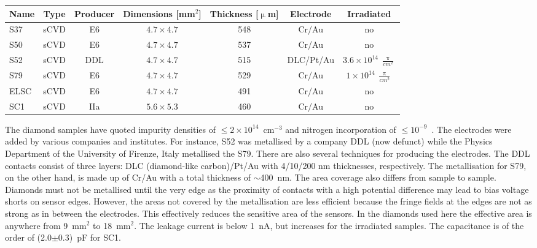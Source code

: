 \begin{footnotesize}
\begin{center}
\begin{tabular}{   l  c  c  c  c c c }
\hline
Name & Type &Producer & Dimensions [mm$^2$] & Thickness [$\upmu$m] & Electrode & Irradiated \\
\hline
S37 & sCVD & E6 & $4.7\times4.7$ & 548 & Cr/Au & no \\
S50 & sCVD & E6 & $4.7\times4.7$ & 537 & Cr/Au & no \\
S52 & sCVD & DDL & $4.7\times4.7$ & 515 & DLC/Pt/Au & $3.6\times10^{14}~\frac{\uppi}{cm^{2}}$ \\
S79 & sCVD & E6 & $4.7\times4.7$ & 529 & Cr/Au & $1\times10^{14}~\frac{\uppi}{cm^{2}}$ \\
ELSC & sCVD & E6 & $4.7\times4.7$ & 491 & Cr/Au & no \\
SC1 & sCVD & IIa & $5.6\times5.3$ & 460 & Cr/Au & no \\
\hline
\end{tabular}
\label{tab:diamsamp}
\end{center}
\end{footnotesize}

The diamond samples have quoted impurity densities of $\leq2\times10^{14}$~cm$^{-3}$ and nitrogen incorporation of $\leq10^{-9}$~\cite{Jansen:1956431}. The electrodes were added by various companies and institutes. For instance, S52 was metallised by a company DDL (now defunct) while the Physics Department of the University of Firenze, Italy metallised the S79. There are also several techniques for producing the electrodes. The DDL contacts consist of three layers: DLC (diamond-like carbon)/Pt/Au with 4/10/200 nm thicknesses, respectively. The metallisation for S79, on the other hand, is made up of Cr/Au with a total thickness of $\sim$400~nm. The area coverage also differs from sample to sample. Diamonds must not be metallised until the very edge as the proximity of contacts with a high potential difference may lead to bias voltage shorts on sensor edges. However, the areas not covered by the metallisation are less efficient because the fringe fields at the edges are not as strong as in between the electrodes. This effectively reduces the sensitive area of the sensors. In the diamonds used here the effective area is anywhere from 9~mm$^2$ to 18~mm$^2$. The leakage current is below 1~nA, but increases for the irradiated samples. The capacitance is of the order of (2.0$\pm$0.3)~pF for SC1.


